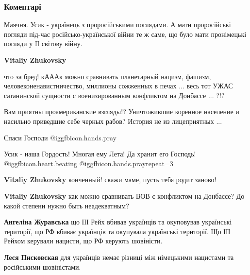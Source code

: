  
 
 
 
 
\subsubsection{Коментарі}

\begin{itemize} %

Маячня. Усик - українець з проросійськими поглядами. А мати проросійські
погляди під-час російсько-української війни те ж саме, що було мати пронімецькі
погляди у ІІ світову війну.

\begin{itemize} %
\textbf{Vitaliy Zhukovsky} 

что за бред! кАААк можно сравнивать планетарный нацизм, фашизм,
человеконенавистничество, миллионы сожженных в печах ... весь тот УЖАС
сатанинской сущности с военизированным конфликтом на Донбассе ... ?!?

Вам приятны проамериканские взгляды!? Уничтожившие коренное население и
насильно приведшие себе черных рабов? История не из лицеприятных ...

Спаси Господи  @igg{fbicon.hands.pray} 

Усик - наша Гордость! Многая ему Лета! Да хранит его Господь!  @igg{fbicon.heart.beating}  @igg{fbicon.hands.pray}{repeat=3} 

\textbf{Vitaliy Zhukovsky} конченный! скажи маме, пусть тебя родит заново!

\textbf{Vitaliy Zhukovsky} как можно сравнивать ВОВ с конфликтом на Донбассе? До какой степени нужно быть неадекватным?

\textbf{Ангеліна Журавська} що ІІІ Рейх вбивав українців та окуповував українські території, що РФ вбиває українців та окупувала українські території. Що ІІІ Рейхом керували нацисти, що РФ керують шовіністи.

\textbf{Леся Писковская} для українців немає різниці між німецькими нацистами та російськими шовіністами.


\end{itemize}
\end{itemize}
